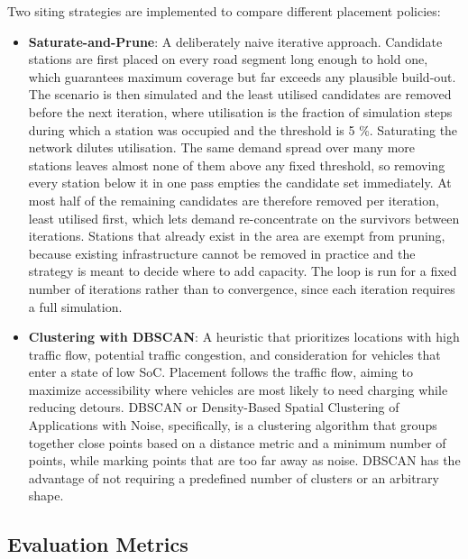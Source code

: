 Two siting strategies are implemented to compare different placement policies:
\begin{itemize}
    \item \textbf{Saturate-and-Prune}: A deliberately naive iterative approach. Candidate stations are first placed on every road segment long enough to hold one, which guarantees maximum coverage but far exceeds any plausible build-out. The scenario is then simulated and the least utilised candidates are removed before the next iteration, where utilisation is the fraction of simulation steps during which a station was occupied and the threshold is 5 \%. Saturating the network dilutes utilisation. The same demand spread over many more stations leaves almost none of them above any fixed threshold, so removing every station below it in one pass empties the candidate set immediately. At most half of the remaining candidates are therefore removed per iteration, least utilised first, which lets demand re-concentrate on the survivors between iterations. Stations that already exist in the area are exempt from pruning, because existing infrastructure cannot be removed in practice and the strategy is meant to decide where to add capacity. The loop is run for a fixed number of iterations rather than to convergence, since each iteration requires a full simulation.
    \item \textbf{Clustering with DBSCAN}: A heuristic that prioritizes locations with high traffic flow, potential traffic congestion, and consideration for vehicles that enter a state of low \ac{SoC}. Placement follows the traffic flow, aiming to maximize accessibility where vehicles are most likely to need charging while reducing detours. DBSCAN or Density-Based Spatial Clustering of Applications with Noise, specifically, is a clustering algorithm that groups together close points based on a distance metric and a minimum number of points, while marking points that are too far away as noise. DBSCAN has the advantage of not requiring a predefined number of clusters or an arbitrary shape.
\end{itemize}



\subsection{Evaluation Metrics}
\label{subsec:eval_metrics}

